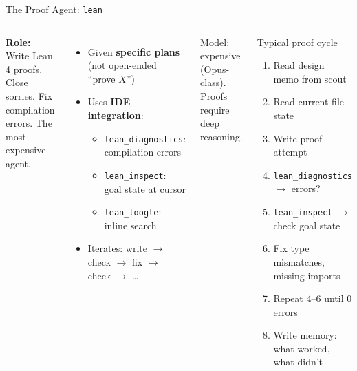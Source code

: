 \documentclass[aspectratio=169,10pt]{beamer}
\begin{document}
\begin{frame}{The Proof Agent: \texttt{lean}}
    \begin{columns}[T]
        \textcolor{leangreen}{\textbf{Role:}} Write Lean 4 proofs. Close sorries. Fix compilation errors. The most expensive agent.
        \vspace{0.3em}
        \begin{itemize}
            \item Given \textbf{specific plans} (not open-ended ``prove $X$'')
            \item Uses \textbf{IDE integration}:
            \begin{itemize}
                \item[$\circ$] \texttt{lean\_diagnostics}: compilation errors
                \item[$\circ$] \texttt{lean\_inspect}: goal state at cursor
                \item[$\circ$] \texttt{lean\_loogle}: inline search
            \end{itemize}
            \item Iterates: write $\to$ check $\to$ fix $\to$ check $\to$ \ldots
        \end{itemize}
        \vspace{0.3em}
        \textcolor{dimwhite}{\footnotesize Model: expensive (Opus-class). Proofs require deep reasoning.}
        \begin{block}{\footnotesize Typical proof cycle}
        \begin{enumerate}
            \item Read design memo from scout
            \item Read current file state
            \item Write proof attempt
            \item \texttt{lean\_diagnostics} $\to$ errors?
            \item \texttt{lean\_inspect} $\to$ check goal state
            \item Fix type mismatches, missing imports
            \item Repeat 4--6 until \textcolor{leangreen}{0 errors}
            \item Write memory: what worked, what didn't
        \end{enumerate}
        \end{block}
    \end{columns}
\end{frame}
\end{document}
